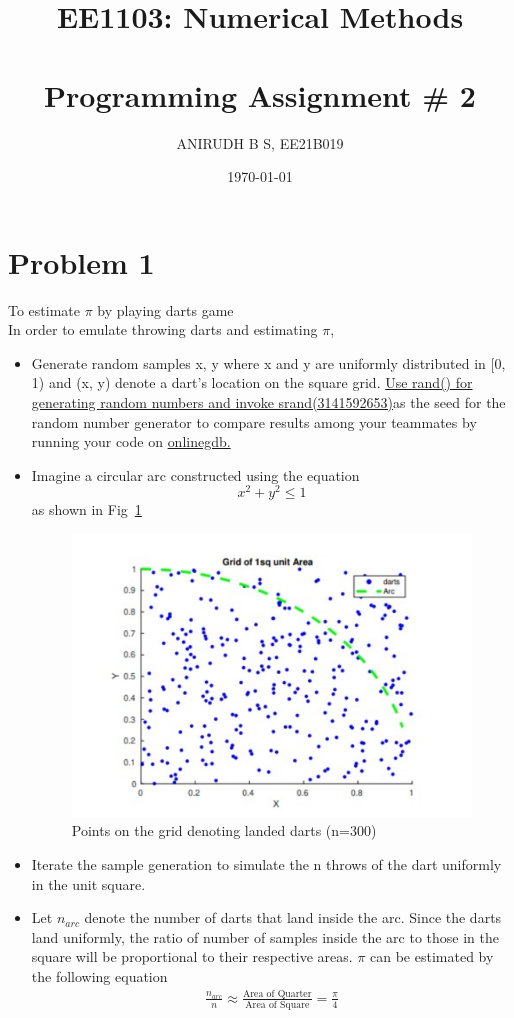 \documentclass[titlepage, 11pt]{article}
\title{
{EE1103: Numerical Methods} \\~\\
{\vlarge Programming Assignment {\#} 2}\\
}\author{ANIRUDH B S, EE21B019}\\
\date{\today}
\begin{document}
\maketitle

\setcounter{page}{0}
\tableofcontents
\listoffigures
\listoftables
\newpage

\section{Problem 1}
To estimate $\pi$ by playing darts game  \\
In order to emulate throwing darts and estimating $\pi$,
\begin{itemize}
    \item Generate random samples x, y where x and y are uniformly distributed in [0, 1) and (x, y) denote a dart’s location on the square grid. \href{https://www.geeksforgeeks.org/rand-and-srand-in-ccpp/}{Use rand() for generating random numbers and invoke srand(3141592653)}as the seed for the random number generator to compare results among your teammates by running your code on \href{https://www.onlinegdb.com/online_c_compiler}{onlinegdb.} 
    \item  Imagine a circular arc constructed using the equation
\begin{equation}
    x^2 + y^2 \leq 1 
\end{equation}
as shown in Fig~\ref{fig:figx}
\begin{figure}
    \centering
    \includegraphics[width=\linewidth]{Question.pdf}
    \caption{Points on the grid denoting landed darts (n=300)}
    \label{fig:figx}
\end{figure}
  \item Iterate the sample generation to simulate the n throws of the dart uniformly in the unit square.
  \item Let $n_{arc}$ denote the number of darts that land inside the arc. Since the darts land uniformly, the ratio of number of samples inside the arc to those in the square will be proportional to their respective areas. $\pi$ can be estimated by the following equation
  \begin{align}
      \frac{n_{arc}}{n} \approx \frac{\mbox{Area of Quarter}}{\mbox{Area of Square}} = \frac{\pi}{4}
  \end{align}

\end{itemize}
\end{document}
